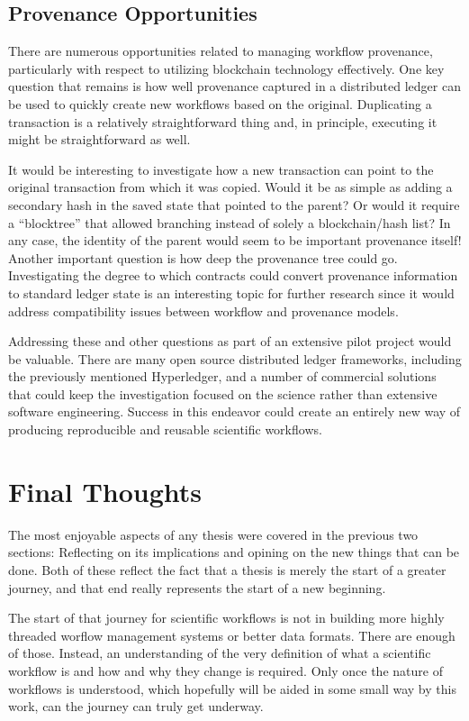 \subsection{Provenance Opportunities}

There are numerous opportunities related to managing workflow provenance,
particularly with respect to utilizing blockchain technology effectively. One
key question that remains is how well provenance captured in a distributed
ledger can be used to quickly create new workflows based on the original.
Duplicating a transaction is a relatively straightforward thing and, in
principle, executing it might be straightforward as well.

It would be interesting to investigate how a new transaction can point to the
original transaction from which it was copied. Would it be as simple as adding a
secondary hash in the saved state that pointed to the parent? Or would it
require a “blocktree” that allowed branching instead of solely a blockchain/hash
list? In any case, the identity of the parent would seem to be important
provenance itself! Another important question is how deep the provenance tree
could go. Investigating the degree to which contracts could convert provenance
information to standard ledger state is an interesting topic for further
research since it would address compatibility issues between workflow and
provenance models.

Addressing these and other questions as part of an extensive pilot project would
be valuable. There are many open source distributed ledger frameworks, including
the previously mentioned Hyperledger, and a number of commercial solutions that
could keep the investigation focused on the science rather than extensive
software engineering. Success in this endeavor could create an entirely new way
of producing reproducible and reusable scientific workflows.

\section{Final Thoughts}

The most enjoyable aspects of any thesis were covered in the previous two
sections: Reflecting on its implications and opining on the new things that
can be done. Both of these reflect the fact that a thesis is merely the start
of a greater journey, and that end really represents the start of a new
beginning.

The start of that journey for scientific workflows is not in building more
highly threaded worflow management systems or better data formats. There are
enough of those. Instead, an understanding of the very definition of what a
scientific workflow is and how and why they change is required. Only once the
nature of workflows is understood, which hopefully will be aided in some small
way by this work, can the journey can truly get underway.

\listoftodos